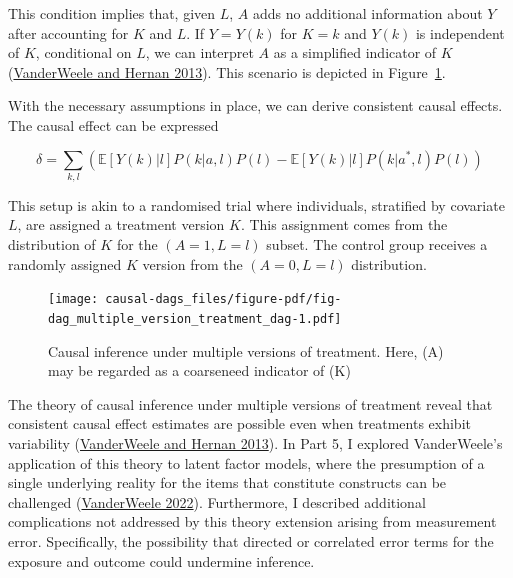 \documentclass[
  singlecolumn]{article}
\begin{document}
This condition implies that, given \(L\), \(A\) adds no additional
information about \(Y\) after accounting for \(K\) and \(L\). If
\(Y = Y(k)\) for \(K = k\) and \(Y(k)\) is independent of \(K\),
conditional on \(L\), we can interpret \(A\) as a simplified indicator
of \(K\) (\protect\hyperlink{ref-vanderweele2013}{VanderWeele and Hernan
2013}). This scenario is depicted in
Figure~\ref{fig-dag_multiple_version_treatment_dag}.

With the necessary assumptions in place, we can derive consistent causal
effects. The causal effect can be expressed

\[\delta = \sum_{k,l} \left( \mathbb{E}[Y(k)|l] P(k|a,l) P(l) - \mathbb{E}[Y(k)|l] P(k|a^*,l) P(l) \right) \]

This setup is akin to a randomised trial where individuals, stratified
by covariate \(L\), are assigned a treatment version \(K\). This
assignment comes from the distribution of \(K\) for the
\((A = 1, L = l)\) subset. The control group receives a randomly
assigned \(K\) version from the \((A = 0, L = l)\) distribution.

\begin{figure}

{\centering \texttt{[image: causal-dags\_files/figure-pdf/fig-dag\_multiple\_version\_treatment\_dag-1.pdf]}

}

\caption{\label{fig-dag_multiple_version_treatment_dag}Causal inference
under multiple versions of treatment. Here, (A) may be regarded as a
coarseneed indicator of (K)}

\end{figure}

The theory of causal inference under multiple versions of treatment
reveal that consistent causal effect estimates are possible even when
treatments exhibit variability
(\protect\hyperlink{ref-vanderweele2013}{VanderWeele and Hernan 2013}).
In Part 5, I explored VanderWeele's application of this theory to latent
factor models, where the presumption of a single underlying reality for
the items that constitute constructs can be challenged
(\protect\hyperlink{ref-vanderweele2022}{VanderWeele 2022}).
Furthermore, I described additional complications not addressed by this
theory extension arising from measurement error. Specifically, the
possibility that directed or correlated error terms for the exposure and
outcome could undermine inference.
\end{document}
